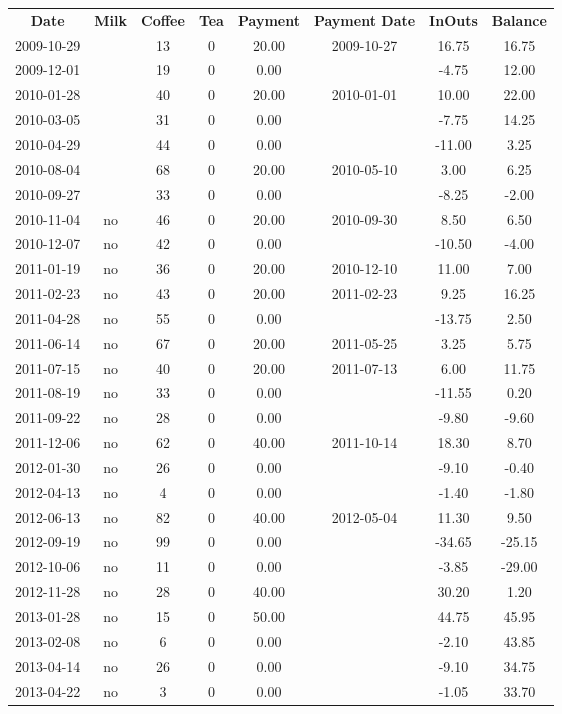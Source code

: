 \begin{center}
\begin{tabular}{cccccccc}
\textbf{Date} & \textbf{Milk} & \textbf{Coffee} & \textbf{Tea} & \textbf{Payment} & \textbf{Payment Date} & \textbf{InOuts} & \textbf{Balance} \\
2009-10-29 &  & 13 & 0 & 20.00 & 2009-10-27 &  16.75 &  16.75\\ 
2009-12-01 &  & 19 & 0 &  0.00 &  &  -4.75 &  12.00\\ 
2010-01-28 &  & 40 & 0 & 20.00 & 2010-01-01 &  10.00 &  22.00\\ 
2010-03-05 &  & 31 & 0 &  0.00 &  &  -7.75 &  14.25\\ 
2010-04-29 &  & 44 & 0 &  0.00 &  & -11.00 &   3.25\\ 
2010-08-04 &  & 68 & 0 & 20.00 & 2010-05-10 &   3.00 &   6.25\\ 
2010-09-27 &  & 33 & 0 &  0.00 &  &  -8.25 &  -2.00\\ 
2010-11-04 & no & 46 & 0 & 20.00 & 2010-09-30 &   8.50 &   6.50\\ 
2010-12-07 & no & 42 & 0 &  0.00 &  & -10.50 &  -4.00\\ 
2011-01-19 & no & 36 & 0 & 20.00 & 2010-12-10 &  11.00 &   7.00\\ 
2011-02-23 & no & 43 & 0 & 20.00 & 2011-02-23 &   9.25 &  16.25\\ 
2011-04-28 & no & 55 & 0 &  0.00 &  & -13.75 &   2.50\\ 
2011-06-14 & no & 67 & 0 & 20.00 & 2011-05-25 &   3.25 &   5.75\\ 
2011-07-15 & no & 40 & 0 & 20.00 & 2011-07-13 &   6.00 &  11.75\\ 
2011-08-19 & no & 33 & 0 &  0.00 &  & -11.55 &   0.20\\ 
2011-09-22 & no & 28 & 0 &  0.00 &  &  -9.80 &  -9.60\\ 
2011-12-06 & no & 62 & 0 & 40.00 & 2011-10-14 &  18.30 &   8.70\\ 
2012-01-30 & no & 26 & 0 &  0.00 &  &  -9.10 &  -0.40\\ 
2012-04-13 & no &  4 & 0 &  0.00 &  &  -1.40 &  -1.80\\ 
2012-06-13 & no & 82 & 0 & 40.00 & 2012-05-04 &  11.30 &   9.50\\ 
2012-09-19 & no & 99 & 0 &  0.00 &  & -34.65 & -25.15\\ 
2012-10-06 & no & 11 & 0 &  0.00 &  &  -3.85 & -29.00\\ 
2012-11-28 & no & 28 & 0 & 40.00 &  &  30.20 &   1.20\\ 
2013-01-28 & no & 15 & 0 & 50.00 &  &  44.75 &  45.95\\ 
2013-02-08 & no &  6 & 0 &  0.00 &  &  -2.10 &  43.85\\ 
2013-04-14 & no & 26 & 0 &  0.00 &  &  -9.10 &  34.75\\ 
2013-04-22 & no &  3 & 0 &  0.00 &  &  -1.05 &  33.70
\end{tabular}
\end{center}


